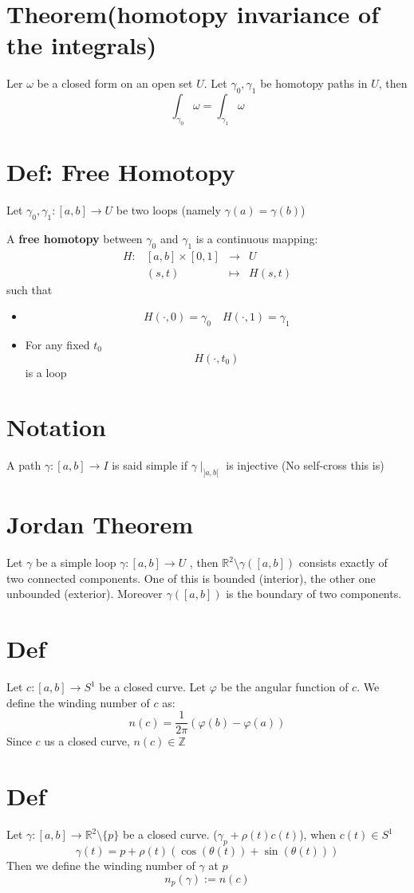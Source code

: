 \documentclass{article}
\newcommand{\leftbracket}{[}
\newcommand{\rightbracket}{]}
\begin{document}
\section{Theorem(homotopy invariance of the integrals)}
Ler $\omega$ be a closed form on an open set $U$. Let $\gamma_0,\gamma_1$ be homotopy paths in $U$, then $$\int_{\gamma_0}\omega=\int_{\gamma_1}\omega$$
\section{Def: Free Homotopy}
Let $\gamma_0,\gamma_1:[a,b]\rightarrow U$ be two loops (namely $\gamma(a)=\gamma(b)$)

A \textbf{free homotopy} between $\gamma_0$ and $\gamma_1$ is a continuous mapping:
$$\begin{aligned}
    H:&[a,b]\times[0,1]&\rightarrow&U\\
    &(s,t)&\mapsto&H(s,t)
\end{aligned}$$
such that\begin{itemize}
    \item $$H(\cdot,0)=\gamma_0\quad H(\cdot,1)=\gamma_1$$
    \item For any fixed $t_0$$$H(\cdot,t_0)$$ is a loop
\end{itemize}
\section{Notation}
A path $\gamma:[a,b]\rightarrow I$ is said simple if $\gamma\mid_{\rightbracket a,b\leftbracket}$ is injective (No self-cross this is)
\section{Jordan Theorem}
Let $\gamma$ be a simple loop $\gamma:[a,b]\rightarrow U$ , then $\mathbb{R}^2\setminus\gamma([a,b])$ consists exactly of two connected components. One of this is bounded (interior), the other one unbounded (exterior). Moreover $\gamma([a,b])$ is the boundary of two components.
\section{Def}
Let $c:[a,b]\rightarrow S^1$ be a closed curve. Let $\varphi$ be the angular function of $c$. We define the winding number of $c$ as:
$$n(c)=\frac{1}{2\pi}(\varphi(b)-\varphi(a))$$
Since $c$ us a closed curve, $n(c)\in \mathbb{Z}$
\section{Def}
Let $\gamma:[a,b]\rightarrow\mathbb{R}^2\setminus\{p\}$ be a closed curve. ($\gamma_p+\rho(t)c(t)$), when $c(t)\in S^1$$$\gamma(t)=p+\rho(t)(\cos(\theta(t))+\sin(\theta(t)))$$
Then we define the winding number of $\gamma$ at $p$
$$n_p(\gamma):=n(c)$$
\end{document}
